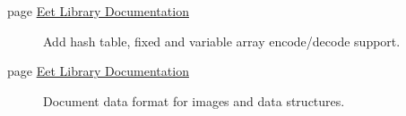 \label{todo__todo000001}
\hypertarget{todo__todo000001}{}
 \begin{description}
\item[page \hyperlink{index}{Eet Library Documentation} ]Add hash table, fixed and variable array encode/decode support. \end{description}


\label{todo__todo000001}
\hypertarget{todo__todo000001}{}
 \begin{description}
\item[page \hyperlink{index}{Eet Library Documentation} ]Document data format for images and data structures.

\end{description}

